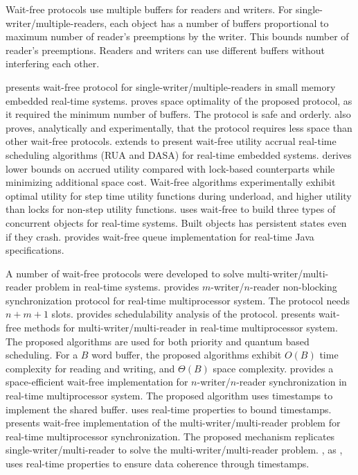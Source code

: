 Wait-free protocols use multiple buffers for readers and writers.
For single-writer/multiple-readers, each object has a number of buffers
proportional to maximum number of reader's preemptions by the writer.
This bounds number of reader's preemptions. Readers and writers can
use different buffers without interfering each other.

\cite{1508449} presents wait-free protocol for single-writer/multiple-readers
in small memory embedded real-time systems. \cite{1508449} proves
space optimality of the proposed protocol, as it required the minimum
number of buffers. The protocol is safe and orderly. \cite{1508449}
also proves, analytically and experimentally, that the protocol requires
less space than other wait-free protocols. \cite{Cho:2006:UAP:1141277.1141490}
extends \cite{1508449} to present wait-free utility accrual real-time
scheduling algorithms (RUA and DASA) for real-time embedded systems.
\cite{Cho:2006:UAP:1141277.1141490} derives lower bounds on accrued
utility compared with lock-based counterparts while minimizing additional
space cost. Wait-free algorithms experimentally exhibit optimal utility
for step time utility functions during underload, and higher utility
than locks for non-step utility functions. \cite{1003807} uses wait-free
to build three types of concurrent objects for real-time systems.
Built objects has persistent states even if they crash. \cite{1613351}
provides wait-free queue implementation for real-time Java specifications.

A number of wait-free protocols were developed to solve multi-writer/multi-reader
problem in real-time systems. \cite{811240} provides $m$-writer/$n$-reader
non-blocking synchronization protocol for real-time multiprocessor
system. The protocol needs $n+m+1$ slots. \cite{811240} provides
schedulability analysis of the protocol. \cite{896371} presents wait-free
methods for multi-writer/multi-reader in real-time multiprocessor
system. The proposed algorithms are used for both priority and quantum
based scheduling. For a $B$ word buffer, the proposed algorithms
exhibit $O(B)$ time complexity for reading and writing, and $\Theta(B)$
space complexity. \cite{896423} provides a space-efficient wait-free
implementation for $n$-writer/$n$-reader synchronization in real-time
multiprocessor system. The proposed algorithm uses timestamps to implement
the shared buffer. \cite{896423} uses real-time properties to bound
timestamps. \cite{1203552} presents wait-free implementation of the
multi-writer/multi-reader problem for real-time multiprocessor synchronization.
The proposed mechanism replicates single-writer/multi-reader to solve
the multi-writer/multi-reader problem. \cite{1203552}, as \cite{896423},
uses real-time properties to ensure data coherence through timestamps.

